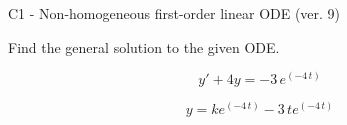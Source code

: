 \begin{exercise}
  \begin{exerciseTitle}C1 - Non-homogeneous first-order linear ODE (ver. 9)\end{exerciseTitle}
  \begin{exerciseStatement}
    
Find the general solution to the given ODE.

    
\[y'+4y= -3 \, e^{\left(-4 \, t\right)}\]

  \end{exerciseStatement}
  \begin{exerciseAnswer}
    
\[y= k e^{\left(-4 \, t\right)} - 3 \, t e^{\left(-4 \, t\right)}\]

  \end{exerciseAnswer}
\end{exercise}